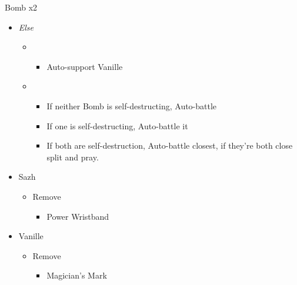 \begin{paracol}{2}
\begin{battle}{Bomb x2}
\begin{itemize}
\begin{itemize}
				      \item \first
				            \begin{itemize}
					            \item Auto-battle Bomb B
				            \end{itemize}
			      \end{itemize}
			\item \textit{Else}
			      \begin{itemize}
				      \item \second
				            \begin{itemize}
					            \item Auto-support Vanille
				            \end{itemize}
				      \item \first
				            \begin{itemize}
					            \item If neither Bomb is self-destructing, Auto-battle
					            \item If one is self-destructing, Auto-battle it
					            \item If both are self-destruction, Auto-battle closest, if they're both close split and pray.
				            \end{itemize}
			      \end{itemize}
		\end{itemize}
	\end{battle}
	\switchcolumn*
	\begin{menu}
		\begin{itemize}
			\equip
			\begin{itemize}
				\item Sazh
				      \begin{itemize}
					      \item Remove
					            \begin{itemize}
						            \item Power Wristband
					            \end{itemize}
				      \end{itemize}
				\item Vanille
				      \begin{itemize}
					      \item Remove
					            \begin{itemize}
						            \item Magician's Mark
					            \end{itemize}
				      \end{itemize}
			\end{itemize}
		\end{itemize}
	\end{menu}


\end{paracol}
